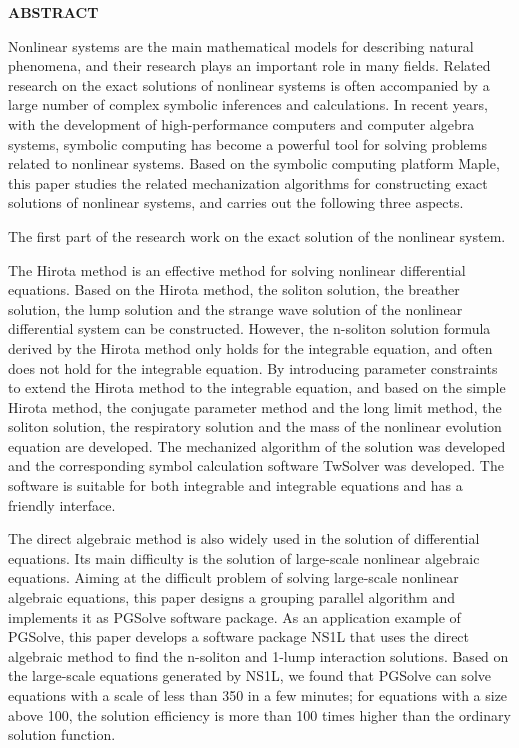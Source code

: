 {}
\centerline{\bfseries ABSTRACT}

\linespread{1.4}
\bigskip

Nonlinear systems are the main mathematical models for describing natural phenomena, and their research plays an important role in many fields. Related research on the exact solutions of nonlinear systems is often accompanied by a large number of complex symbolic inferences and calculations. In recent years, with the development of high-performance computers and computer algebra systems, symbolic computing has become a powerful tool for solving problems related to nonlinear systems. Based on the symbolic computing platform Maple, this paper studies the related mechanization algorithms for constructing exact solutions of nonlinear systems, and carries out the following three aspects.

The first part of the research work on the exact solution of the nonlinear system.

The Hirota method is an effective method for solving nonlinear differential equations. Based on the Hirota method, the soliton solution, the breather solution, the lump solution and the strange wave solution of the nonlinear differential system can be constructed. However, the n-soliton solution formula derived by the Hirota method only holds for the integrable equation, and often does not hold for the integrable equation. By introducing parameter constraints to extend the Hirota method to the integrable equation, and based on the simple Hirota method, the conjugate parameter method and the long limit method, the soliton solution, the respiratory solution and the mass of the nonlinear evolution equation are developed. The mechanized algorithm of the solution was developed and the corresponding symbol calculation software TwSolver was developed. The software is suitable for both integrable and integrable equations and has a friendly interface.

The direct algebraic method is also widely used in the solution of differential equations. Its main difficulty is the solution of large-scale nonlinear algebraic equations. Aiming at the difficult problem of solving large-scale nonlinear algebraic equations, this paper designs a grouping parallel algorithm and implements it as PGSolve software package. As an application example of PGSolve, this paper develops a software package NS1L that uses the direct algebraic method to find the n-soliton and 1-lump interaction solutions. Based on the large-scale equations generated by NS1L, we found that PGSolve can solve equations with a scale of less than 350 in a few minutes; for equations with a size above 100, the solution efficiency is more than 100 times higher than the ordinary solution function.

